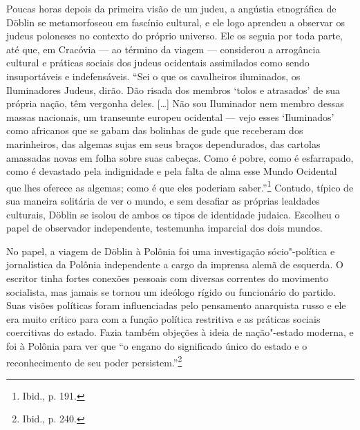 Poucas horas depois da primeira visão de um judeu, a angústia
etnográfica de Döblin se metamorfoseou em fascínio cultural, e ele logo
aprendeu a observar os judeus poloneses no contexto do próprio universo.
Ele os seguia por toda parte, até que, em Cracóvia --- ao término da
viagem --- considerou a arrogância cultural e práticas sociais dos judeus
ocidentais assimilados como sendo insuportáveis e indefensáveis. ``Sei o
que os cavalheiros iluminados, os Iluminadores Judeus, dirão. Dão risada
dos membros `tolos e atrasados' de sua própria nação, têm vergonha
deles. [\ldots{}] Não sou Iluminador nem membro dessas massas nacionais,
um transeunte europeu ocidental --- vejo esses `Iluminados' como africanos
que se gabam das bolinhas de gude que receberam dos marinheiros, das
algemas sujas em seus braços dependurados, das cartolas amassadas novas
em folha sobre suas cabeças. Como é pobre, como é esfarrapado, como é
devastado pela indignidade e pela falta de alma esse Mundo Ocidental que
lhes oferece as algemas; como é que eles poderiam saber.''\footnote{Ibid., p. 191.} Contudo, típico de sua maneira solitária de ver o mundo, e sem desafiar as próprias lealdades culturais, Döblin se isolou de ambos
os tipos de identidade judaica. Escolheu o papel de observador
independente, testemunha imparcial dos dois mundos.

\asterisc

No papel, a viagem de Döblin à Polônia foi uma investigação
sócio"-política e jornalística da Polônia independente a cargo da
imprensa alemã de esquerda. O escritor tinha fortes conexões pessoais
com diversas correntes do movimento socialista, mas jamais se tornou um
ideólogo rígido ou funcionário do partido. Suas visões políticas foram
influenciadas pelo pensamento anarquista russo e ele era muito crítico
para com a função política restritiva e as práticas sociais coercitivas
do estado. Fazia também objeções à ideia de nação"-estado moderna, e foi
à Polônia para ver que ``o engano do significado único do estado e o
reconhecimento de seu poder persistem.''\footnote{Ibid., p. 240.}

